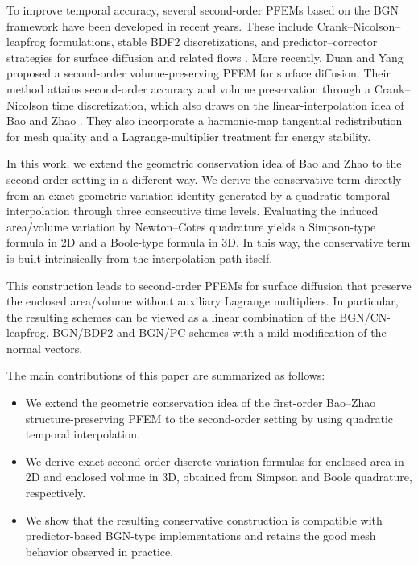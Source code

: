 \documentclass[smallextended]{svjour3}
\numberwithin{equation}{section}
\begin{document}
To improve temporal accuracy, several second-order PFEMs based on the BGN framework have been developed in recent years. These include Crank--Nicolson--leapfrog formulations, stable BDF2 discretizations, and predictor--corrector strategies for surface diffusion and related flows \cite{jiang2024second,jiang2024stable,jiang2025predictor}. More recently, Duan and Yang \cite{duan2026second} proposed a second-order volume-preserving PFEM for surface diffusion. Their method attains second-order accuracy and volume preservation through a Crank--Nicolson time discretization, which also draws on the linear-interpolation idea of Bao and Zhao \cite{bao2021structure}. They also incorporate a harmonic-map tangential redistribution for mesh quality and a Lagrange-multiplier treatment for energy stability.

In this work, we extend the geometric conservation idea of Bao and Zhao to the second-order setting in a different way. We derive the conservative term directly from an exact geometric variation identity generated by a quadratic temporal interpolation through three consecutive time levels. Evaluating the induced area/volume variation by Newton--Cotes quadrature yields a Simpson-type formula in 2D and a Boole-type formula in 3D. In this way, the conservative term is built intrinsically from the interpolation path itself.

This construction leads to second-order PFEMs for surface diffusion that preserve the enclosed area/volume without auxiliary Lagrange multipliers.  In particular, the resulting schemes can be viewed as a linear combination of the BGN/CN-leapfrog, BGN/BDF2 and BGN/PC schemes \cite{jiang2024second,jiang2024stable,jiang2025predictor} with a mild modification of the normal vectors.
	
	The main contributions of this paper are summarized as follows:
	\begin{itemize}
		\item We extend the geometric conservation idea of the first-order Bao--Zhao structure-preserving PFEM to the second-order setting by using quadratic temporal interpolation.
		\item We derive exact second-order discrete variation formulas for enclosed area in 2D and enclosed volume in 3D, obtained from Simpson and Boole quadrature, respectively.
		\item We show that the resulting conservative construction is compatible with predictor-based BGN-type implementations and retains the good mesh behavior observed in practice.
	\end{itemize}
	
\end{document}
